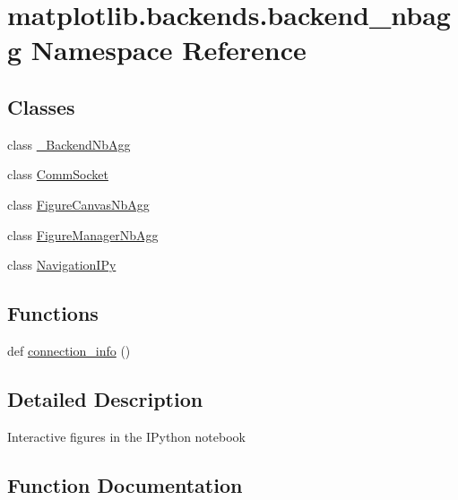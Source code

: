 \hypertarget{namespacematplotlib_1_1backends_1_1backend__nbagg}{}\section{matplotlib.\+backends.\+backend\+\_\+nbagg Namespace Reference}
\label{namespacematplotlib_1_1backends_1_1backend__nbagg}
\subsection*{Classes}
\begin{DoxyCompactItemize}
\item 
class \hyperlink{classmatplotlib_1_1backends_1_1backend__nbagg_1_1__BackendNbAgg}{\+\_\+\+Backend\+Nb\+Agg}
\item 
class \hyperlink{classmatplotlib_1_1backends_1_1backend__nbagg_1_1CommSocket}{Comm\+Socket}
\item 
class \hyperlink{classmatplotlib_1_1backends_1_1backend__nbagg_1_1FigureCanvasNbAgg}{Figure\+Canvas\+Nb\+Agg}
\item 
class \hyperlink{classmatplotlib_1_1backends_1_1backend__nbagg_1_1FigureManagerNbAgg}{Figure\+Manager\+Nb\+Agg}
\item 
class \hyperlink{classmatplotlib_1_1backends_1_1backend__nbagg_1_1NavigationIPy}{Navigation\+I\+Py}
\end{DoxyCompactItemize}
\subsection*{Functions}
\begin{DoxyCompactItemize}
\item 
def \hyperlink{namespacematplotlib_1_1backends_1_1backend__nbagg_a7c1c61c5a45cc693c2a5798d5f386ccd}{connection\+\_\+info} ()
\end{DoxyCompactItemize}


\subsection{Detailed Description}
\begin{DoxyVerb}Interactive figures in the IPython notebook\end{DoxyVerb}
 

\subsection{Function Documentation}
\mbox{\label{namespacematplotlib_1_1backends_1_1backend__nbagg_a7c1c61c5a45cc693c2a5798d5f386ccd}} 
